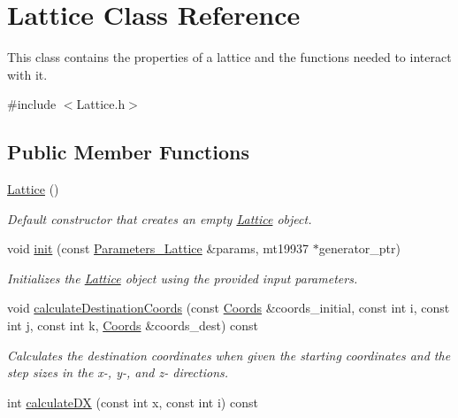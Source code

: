 \hypertarget{class_lattice}{}\section{Lattice Class Reference}
\label{class_lattice}


This class contains the properties of a lattice and the functions needed to interact with it.  




{\ttfamily \#include $<$Lattice.\+h$>$}

\subsection*{Public Member Functions}
\begin{DoxyCompactItemize}
\item 
\mbox{\label{class_lattice_a70a5cebc3c0c5a0f609be0592e7cc117}} 
\hyperlink{class_lattice_a70a5cebc3c0c5a0f609be0592e7cc117}{Lattice} ()
\begin{DoxyCompactList}\small\item\em Default constructor that creates an empty \hyperlink{class_lattice}{Lattice} object. \end{DoxyCompactList}\item 
void \hyperlink{class_lattice_a4067a9617cc24fa60ca6b47fccb4c123}{init} (const \hyperlink{struct_parameters___lattice}{Parameters\+\_\+\+Lattice} \&params, mt19937 $\ast$generator\+\_\+ptr)
\begin{DoxyCompactList}\small\item\em Initializes the \hyperlink{class_lattice}{Lattice} object using the provided input parameters. \end{DoxyCompactList}\item 
void \hyperlink{class_lattice_aa6b80d6264bfc23ae5fea39abd2557d5}{calculate\+Destination\+Coords} (const \hyperlink{struct_coords}{Coords} \&coords\+\_\+initial, const int i, const int j, const int k, \hyperlink{struct_coords}{Coords} \&coords\+\_\+dest) const
\begin{DoxyCompactList}\small\item\em Calculates the destination coordinates when given the starting coordinates and the step sizes in the x-\/, y-\/, and z-\/ directions. \end{DoxyCompactList}\item 
int \hyperlink{class_lattice_a08adb2f412af409d3ec241e60e687c1a}{calculate\+DX} (const int x, const int i) const

\end{DoxyCompactItemize}
